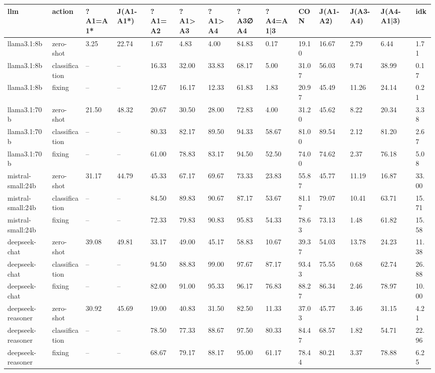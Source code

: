 \begin{table}[!t]
\centering\scriptsize
\begin{tabular}{llllllllllllll}
\toprule
llm & action & ?A1=A1* & J(A1-A1*) & ?A1=A2 & ?A1>A3 & ?A1>A4 & ?A3∅A4 & ?A4=A1|3 & CON & J(A1-A2) & J(A3-A4) & J(A4-A1|3) & idk \\
\midrule
llama3.1:8b & zero-shot & 3.25 & 22.74 & 1.67 & 4.83 & 4.00 & 84.83 & 0.17 & 19.10 & 16.67 & 2.79 & 6.44 & 1.71 \\
llama3.1:8b & classification & -- & -- & 16.33 & 32.00 & 33.83 & 68.17 & 5.00 & 31.07 & 56.03 & 9.74 & 38.99 & 0.17 \\
llama3.1:8b & fixing & -- & -- & 12.67 & 16.17 & 12.33 & 61.83 & 1.83 & 20.97 & 45.49 & 11.26 & 24.14 & 0.21 \\
llama3.1:70b & zero-shot & 21.50 & 48.32 & 20.67 & 30.50 & 28.00 & 72.83 & 4.00 & 31.20 & 45.62 & 8.22 & 20.34 & 3.38 \\
llama3.1:70b & classification & -- & -- & 80.33 & 82.17 & 89.50 & 94.33 & 58.67 & 81.00 & 89.54 & 2.12 & 81.20 & 2.67 \\
llama3.1:70b & fixing & -- & -- & 61.00 & 78.83 & 83.17 & 94.50 & 52.50 & 74.00 & 74.62 & 2.37 & 76.18 & 5.08 \\
mistral-small:24b & zero-shot & 31.17 & 44.79 & 45.33 & 67.17 & 69.67 & 73.33 & 23.83 & 55.87 & 45.77 & 11.19 & 16.87 & 33.00 \\
mistral-small:24b & classification & -- & -- & 84.50 & 89.83 & 90.67 & 87.17 & 53.67 & 81.17 & 79.07 & 10.41 & 63.71 & 15.71 \\
mistral-small:24b & fixing & -- & -- & 72.33 & 79.83 & 90.83 & 95.83 & 54.33 & 78.63 & 73.13 & 1.48 & 61.82 & 15.58 \\
deepseek-chat & zero-shot & 39.08 & 49.81 & 33.17 & 49.00 & 45.17 & 58.83 & 10.67 & 39.37 & 54.03 & 13.78 & 24.23 & 11.38 \\
deepseek-chat & classification & -- & -- & 94.50 & 88.83 & 99.00 & 97.67 & 87.17 & 93.43 & 75.55 & 0.68 & 62.74 & 26.88 \\
deepseek-chat & fixing & -- & -- & 82.00 & 91.00 & 95.33 & 96.17 & 76.83 & 88.27 & 86.34 & 2.46 & 78.97 & 10.00 \\
deepseek-reasoner & zero-shot & 30.92 & 45.69 & 19.00 & 40.83 & 31.50 & 82.50 & 11.33 & 37.03 & 45.77 & 3.46 & 31.15 & 4.21 \\
deepseek-reasoner & classification & -- & -- & 78.50 & 77.33 & 88.67 & 97.50 & 80.33 & 84.47 & 68.57 & 1.82 & 54.71 & 22.96 \\
deepseek-reasoner & fixing & -- & -- & 68.67 & 79.17 & 88.17 & 95.00 & 61.17 & 78.44 & 80.21 & 3.37 & 78.88 & 6.25 \\

\end{tabular}
\end{table}
